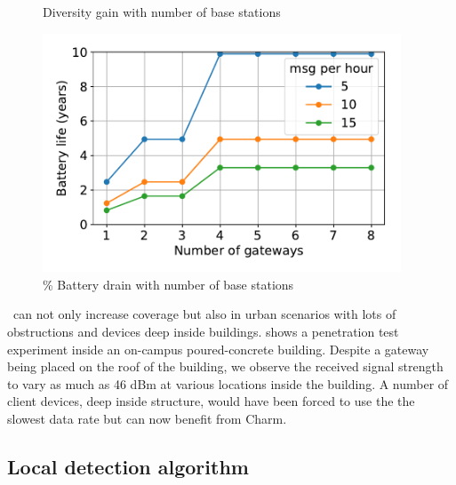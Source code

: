 \begin{figure}
\begin{minipage}{.32\textwidth}
\hspace*{-0.1in}
\caption{Diversity gain with number of base stations}
\label{fig:diversity-gain}
\compactimg
\end{minipage}
\hfill
\begin{minipage}{.32\textwidth}
\centering
\includegraphics[width=0.95\textwidth]{figures/diversity_battery}
\hspace*{-0.1in}
\caption{\% Battery drain with number of base stations}
\label{fig:diversity-gain}
\compactimg
\end{minipage}
\end{figure}




\name\ can not only increase coverage but also in urban scenarios with lots of obstructions and devices deep inside buildings.  shows a penetration test experiment inside an on-campus poured-concrete building. Despite a gateway being placed on the roof of the building, we observe the received signal strength to vary as much as 46 dBm at various locations inside the building. A number of client devices, deep inside structure, would have been forced to use the the slowest data rate but can now benefit from Charm.

\subsection{Local detection algorithm}
\label{sec:local-detection-eval}



